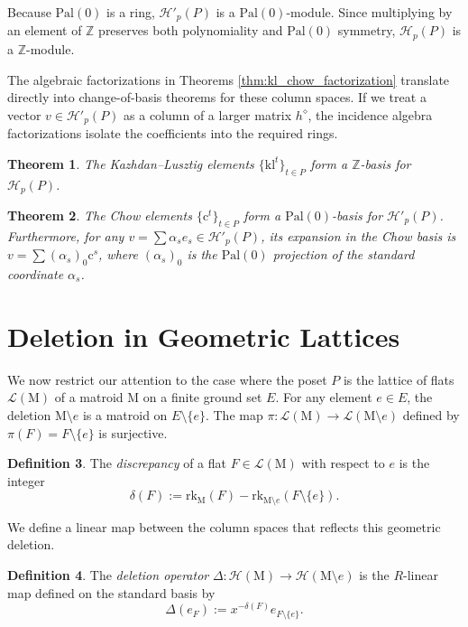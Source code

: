 \documentclass{article}
\newcommand{\rk}{\text{rk}}
\newcommand{\M}{\mathrm{M}}
\newcommand{\Pal}[1]{\mathrm{Pal}(#1)}
\newcommand{\KLbasis}[1]{\mathrm{kl}^{#1}}
\newcommand{\Cbasis}[1]{\mathrm{c}^{#1}}
\newcommand{\hbasis}[1]{\mathcal{H}_{#1}(P)}
\newcommand{\cbasis}[1]{\mathcal{H}'_{#1}(P)}
\newtheorem{theorem}{Theorem}[section]
\theoremstyle{definition}
\newtheorem{definition}[theorem]{Definition}
\theoremstyle{remark}
\begin{document}
Because \(\Pal{0}\) is a ring, \(\cbasis{p}\) is a \(\Pal{0}\)-module. Since multiplying by an element of \(\mathbb{Z}\) preserves both polynomiality and \(\Pal{0}\) symmetry, \(\hbasis{p}\) is a \(\mathbb{Z}\)-module. 

The algebraic factorizations in Theorems \ref{thm:kl_chow_factorization} translate directly into change-of-basis theorems for these column spaces. If we treat a vector \(v \in \cbasis{p}\) as a column of a larger matrix \(h^\diamond\), the incidence algebra factorizations isolate the coefficients into the required rings.

\begin{theorem} \label{thm:kl_basis}
    The Kazhdan--Lusztig elements \(\{\KLbasis{t}\}_{t \in P}\) form a \(\mathbb{Z}\)-basis for \(\hbasis{p}\). 
\end{theorem}

\begin{theorem} \label{thm:chow_basis}
    The Chow elements \(\{\Cbasis{t}\}_{t \in P}\) form a \(\Pal{0}\)-basis for \(\cbasis{p}\). Furthermore, for any \(v = \sum \alpha_s e_s \in \cbasis{p}\), its expansion in the Chow basis is \(v = \sum (\alpha_s)_0 \Cbasis{s}\), where \((\alpha_s)_0\) is the \(\Pal{0}\) projection of the standard coordinate \(\alpha_s\).
\end{theorem}

\section{Deletion in Geometric Lattices}

We now restrict our attention to the case where the poset \(P\) is the lattice of flats \(\mathcal{L}(\M)\) of a matroid \(\M\) on a finite ground set \(E\). For any element \(e \in E\), the deletion \(\M \setminus e\) is a matroid on \(E \setminus \{e\}\). The map \(\pi: \mathcal{L}(\M) \to \mathcal{L}(\M \setminus e)\) defined by \(\pi(F) = F \setminus \{e\}\) is surjective.

\begin{definition}
    The \emph{discrepancy} of a flat \(F \in \mathcal{L}(\M)\) with respect to \(e\) is the integer
    \[ \delta(F) := \rk_{\M}(F) - \rk_{\M \setminus e}(F \setminus \{e\}). \]
\end{definition}

We define a linear map between the column spaces that reflects this geometric deletion.

\begin{definition}
    The \emph{deletion operator} \(\Delta: \mathcal{H}(\M) \to \mathcal{H}(\M \setminus e)\) is the \(R\)-linear map defined on the standard basis by
    \[ \Delta(e_F) := x^{-\delta(F)} e_{F \setminus \{e\}}. \]
\end{definition}
\end{document}
